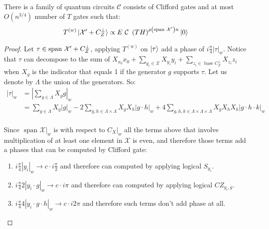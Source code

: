 \documentclass[manuscript,screen,review]{acmart}
\begin{document}
\begin{claim}
  \label{Claim:flift}
  There is a family of quantum circuits $\mathcal{C}$ consists of Clifford gates and at most $O(n^{3/4})$ number of $T$ gates such that: 
  \begin{equation*}
    \begin{split}
      T^{(w)}\ket{\Mbas + C_{Z}^{\perp}} \propto E \ \mathcal{C} \ \left(TH\right)^{\rho\left(\sMbas\right)n} \ket{0} 
    \end{split}
  \end{equation*}
\end{claim}
\begin{proof}
  Let $\tau \in \text{span }\mathcal{X}^\prime + C_{Z}^\perp$, applying $T^{(w)}$ on $\ket{\tau}$ add a phase of $i\frac{\pi}{4}\left|\tau\right|_{w}$. Notice that $\tau$ can decompose to the sum of  $X_{x_{0}}x_{0} + \sum_{y_{i} \in \mathcal{X}}{X_{y_{i}}y_{i}} + \sum_{z_{i} \in \text{ base }C_{Z}^{\perp}}{X_{z_{i}}z_{i}}$ when $X_{g}$ is the indicator that equals 1 if the generator $g$ supports $\tau$. Let us denote by $\Lambda$ the union of the generators. So:
  \begin{equation*}
    \begin{split}
      \left|\tau\right|_{w} &= \left| \sum_{g \in \Lambda}{ X_{g}g }\right|_{w} \\
      &= \sum_{g\in \Lambda}{X_{g}|g|_{w}} - 2\sum_{g,h\in \Lambda \times \Lambda}{X_{g}X_{h}|g \cdot h |_{w}}+ 4\sum_{g, h, k\in \Lambda \times \Lambda \times \Lambda }{X_{g}X_{h}X_{k}|g \cdot h \cdot k |_{w}}  \\
    \end{split}
  \end{equation*}
  
  Since $\text{ span } \mathcal{X}|_{w}$ is \trig with respect to $C_{X}|_{w}$ all the terms above that involve multiplication of at least one element in $\mathcal{X}$ is even, and therefore those terms add a phases that can be computed by Clifford gate:\begin{enumerate}
    \item $i\frac{\pi}{4}|y_{i}|_{w} \rightarrow c \cdot i\frac{\pi}{2}$ and therefore can computed by applying logical $S_{y_{i}}$.
    \item $i\frac{\pi}{4}2|y_{i}\cdot g|_{w} \rightarrow c \cdot i\pi$ and therefore can computed by applying logical $CZ_{y_{i},g}$.
    \item $i\frac{\pi}{4}4|y_{i}\cdot g \cdot h |_{w} \rightarrow c \cdot i2\pi$ and therefore such terms don't add phase at all.
  \end{enumerate}


\end{proof}
\end{document}

